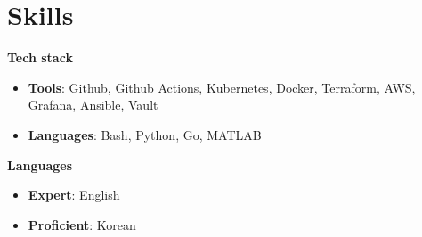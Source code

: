 \documentclass[11pt,letterpaper]{article}
\newcommand{\header}[1]{\textbf{\color{headercolor}#1}}
\begin{document}
\section*{Skills}
\header{Tech stack}
\begin{itemize}[leftmargin=2em,itemsep=0.3ex]
  \item \textbf{Tools}: Github, Github Actions, Kubernetes, Docker, Terraform, AWS, Grafana, Ansible, Vault
  \item \textbf{Languages}: Bash, Python, Go, MATLAB
\end{itemize}
\header{Languages}
\begin{itemize}[leftmargin=2em,itemsep=0.3ex]
	\item \textbf{Expert}: English
	\item \textbf{Proficient}: Korean
\end{itemize}
\end{document}
